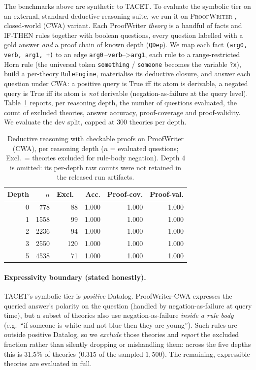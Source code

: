 \documentclass[11pt]{article}
\theoremstyle{plain}
\newcommand{\pwExclFrac}{0.315}
\newcommand{\pwExclPct}{31.5}
\renewcommand{\pwExclFrac}{0.315}
\renewcommand{\pwExclPct}{31.5}
\begin{document}
The benchmarks above are synthetic to TACET. To evaluate the symbolic tier on
an external, standard deductive-reasoning suite, we run it on
\textsc{ProofWriter} \citep{tafjord2021proofwriter}, closed-world (CWA) variant.
Each ProofWriter \emph{theory} is a handful of facts and IF-THEN rules together
with boolean questions, every question labelled with a gold answer \emph{and} a
proof chain of known depth (\texttt{QDep}). We map each fact
\texttt{(arg0, verb, arg1, +)} to an edge \texttt{arg0}\,--\texttt{verb}-->\texttt{arg1},
each rule to a range-restricted Horn rule (the universal token \texttt{something}
/ \texttt{someone} becomes the variable \texttt{?x}), build a per-theory
\texttt{RuleEngine}, materialise its deductive closure, and answer each question
under CWA: a positive query is True iff its atom is derivable, a negated query is
True iff its atom is \emph{not} derivable (negation-as-failure at the query
level). Table~\ref{tab:proofwriter} reports, per reasoning depth, the number of
questions evaluated, the count of excluded theories, answer accuracy,
proof-coverage and proof-validity. We evaluate the dev split, capped at $300$
theories per depth.

\begin{table}[t]
\centering
\caption{Deductive reasoning with checkable proofs on ProofWriter (CWA), per
reasoning depth ($n$ = evaluated questions; Excl.\ = theories excluded for
rule-body negation). Depth $4$ is omitted: its per-depth raw counts were not
retained in the released run artifacts.}
\label{tab:proofwriter}
\begin{tabular}{rrrrrr}
\toprule
Depth & $n$ & Excl.\ & Acc. & Proof-cov. & Proof-val. \\
\midrule
0 & 778 & 88 & 1.000 & 1.000 & 1.000 \\
1 & 1558 & 99 & 1.000 & 1.000 & 1.000 \\
2 & 2236 & 94 & 1.000 & 1.000 & 1.000 \\
3 & 2550 & 120 & 1.000 & 1.000 & 1.000 \\
5 & 4538 & 71 & 1.000 & 1.000 & 1.000 \\
\bottomrule
\end{tabular}

\end{table}

\paragraph{Expressivity boundary (stated honestly).} TACET's symbolic tier is
\emph{positive} Datalog. ProofWriter-CWA expresses the queried answer's polarity
on the question (handled by negation-as-failure at query time), but a subset of
theories also use negation-as-failure \emph{inside a rule body} (e.g.\ ``if
someone is white and not blue then they are young''). Such rules are outside
positive Datalog, so we \emph{exclude} those theories and \emph{report} the
excluded fraction rather than silently dropping or mishandling them: across the
five depths this is \pwExclPct{}\% of theories ($\pwExclFrac{}$ of the sampled
$1{,}500$). The remaining, expressible theories are evaluated in full.
\end{document}
